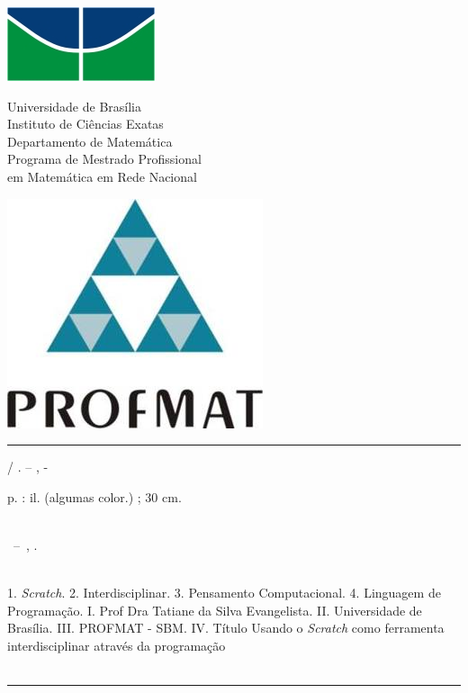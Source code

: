 \documentclass[12pt, openright, a4paper, brazil, english, french, spanish, bibjustif, openany, oneside]{abntex2}
\renewcommand{\imprimircapa}{%
  \begin{capa}%
    \center
    \begin{minipage}[t][1cm][c]{0.2\textwidth}
        \includegraphics[scale=0.6,keepaspectratio=true]{unb.png}
    \end{minipage}
    \begin{minipage}[t][1cm][c]{0.5\textwidth}
        \begin{center}
        Universidade de Brasília \\
        Instituto de Ciências Exatas \\
        Departamento de Matemática \\
        Programa de Mestrado Profissional\\
        em Matemática em Rede Nacional
        \end{center}
    \end{minipage}
    \begin{minipage}[t][1cm][c]{0.2\textwidth}
        \includegraphics[scale=0.6,keepaspectratio=true]{profmat.jpg}
    \end{minipage}

    \vspace*{1cm}

    \vfill
    \begin{center}
    \ABNTEXchapterfont\bfseries\LARGE\imprimirtitulo
    \end{center}
    \vfill

    {\ABNTEXchapterfont\large\imprimirautor}

    \vspace*{2cm}

    \large\imprimirlocal

    \large\imprimirdata

    \vspace*{1cm}
  \end{capa}
}
\begin{document}


\frenchspacing 
\imprimircapa
\imprimirfolhaderosto*
\ABNTEXchapterfont


\begin{fichacatalografica}
	\vspace*{\fill}					%
	\hrule							%
	\begin{center}					%
	\begin{minipage}[c]{12.5cm}		%

	\imprimirautor
	
	\hspace{0.5cm} \imprimirtitulo  / \imprimirautor. --
	\imprimirlocal, \imprimirdata-
	
	\hspace{0.5cm} \pageref{LastPage} p. : il. (algumas color.) ; 30 cm.\\
	
	\hspace{0.5cm} \imprimirorientadorRotulo~\imprimirorientador\\
	
	\hspace{0.5cm}
	\parbox[t]{\textwidth}{\imprimirtipotrabalho~--~\imprimirinstituicao,
	\imprimirdata.}\\
	
	\hspace{0.5cm}
		1. \textit{Scratch}.
		2. Interdisciplinar.
		3. Pensamento Computacional.
		4. Linguagem de Programação.
		I. Prof Dra Tatiane da Silva Evangelista.
		II. Universidade de Brasília.
		III. PROFMAT - SBM.
		IV. Título Usando o \textit{Scratch} como ferramenta interdisciplinar através da programação\\ 			
	
	\hspace{8.75cm} \\ %
	
	\end{minipage}
	\end{center}
	\hrule
\end{fichacatalografica}

\end{document}

